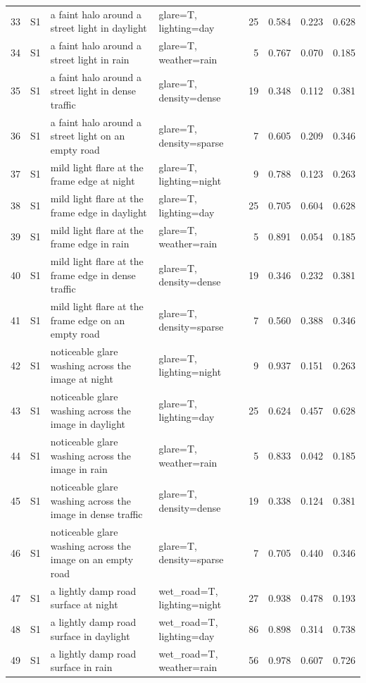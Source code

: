 \begin{longtable}{r l p{5.0cm} p{3.4cm} r r r r}
33 & S1 & a faint halo around a street light in daylight & glare=T, lighting=day & 25 & 0.584 & 0.223 & 0.628\\
34 & S1 & a faint halo around a street light in rain & glare=T, weather=rain & 5 & 0.767 & 0.070 & 0.185\\
35 & S1 & a faint halo around a street light in dense traffic & glare=T, density=dense & 19 & 0.348 & 0.112 & 0.381\\
36 & S1 & a faint halo around a street light on an empty road & glare=T, density=sparse & 7 & 0.605 & 0.209 & 0.346\\
37 & S1 & mild light flare at the frame edge at night & glare=T, lighting=night & 9 & 0.788 & 0.123 & 0.263\\
38 & S1 & mild light flare at the frame edge in daylight & glare=T, lighting=day & 25 & 0.705 & 0.604 & 0.628\\
39 & S1 & mild light flare at the frame edge in rain & glare=T, weather=rain & 5 & 0.891 & 0.054 & 0.185\\
40 & S1 & mild light flare at the frame edge in dense traffic & glare=T, density=dense & 19 & 0.346 & 0.232 & 0.381\\
41 & S1 & mild light flare at the frame edge on an empty road & glare=T, density=sparse & 7 & 0.560 & 0.388 & 0.346\\
42 & S1 & noticeable glare washing across the image at night & glare=T, lighting=night & 9 & 0.937 & 0.151 & 0.263\\
43 & S1 & noticeable glare washing across the image in daylight & glare=T, lighting=day & 25 & 0.624 & 0.457 & 0.628\\
44 & S1 & noticeable glare washing across the image in rain & glare=T, weather=rain & 5 & 0.833 & 0.042 & 0.185\\
45 & S1 & noticeable glare washing across the image in dense traffic & glare=T, density=dense & 19 & 0.338 & 0.124 & 0.381\\
46 & S1 & noticeable glare washing across the image on an empty road & glare=T, density=sparse & 7 & 0.705 & 0.440 & 0.346\\
47 & S1 & a lightly damp road surface at night & wet\_road=T, lighting=night & 27 & 0.938 & 0.478 & 0.193\\
48 & S1 & a lightly damp road surface in daylight & wet\_road=T, lighting=day & 86 & 0.898 & 0.314 & 0.738\\
49 & S1 & a lightly damp road surface in rain & wet\_road=T, weather=rain & 56 & 0.978 & 0.607 & 0.726\\

\end{longtable}
